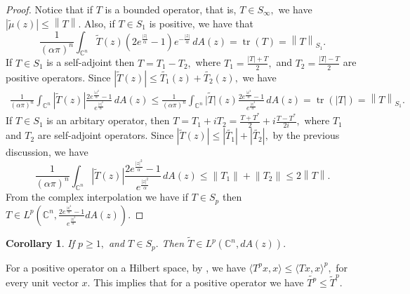 \documentclass[10pt,leqno]{amsart}
\newtheorem{proposition}[theorem]{Proposition}
\newtheorem{corollary}[theorem]{Corollary}
\theoremstyle{remark}
\numberwithin{equation}{section}
\DeclareMathOperator{\tr}{tr}
\begin{document}
\begin{proof}
	Notice that if $T$ is a bounded operator, that is, $T \in S_{\infty},$ we have $|\widetilde{\mu}(z)| \leq \left\lVert T \right\rVert. $ Also, if $T \in S_1$ is positive, we have that
	\[
		\frac{1}{\left( \alpha \pi \right) ^{n}}\int_{\mathbb{C}^{n}}^{}\widetilde{T}(z) \left( 2e^{\frac{|z|}{\alpha}}-1 \right) e^{-\frac{|z|}{\alpha}}\, dA(z) = \tr(T)=\left\lVert T \right\rVert _{S_{1}}.
	\]
	If $T \in S_1 $ is a self-adjoint then $T=T_1 -T_2,$ where $T_1 =\frac{|T|+T}{2},$ and $T_2 = \frac{|T|-T}{2}$ are positive operators. Since $|\widetilde{T}(z)|\leq \widetilde{T_1 }(z)+\widetilde{T_2 }(z),$ we have
	\begin{align*}
		\frac{1}{\left( \alpha \pi \right) ^{n}} \int_{\mathbb{C}^{n}}^{}\left| \widetilde{T}(z) \right| \frac{2e^{\frac{|z|^2}{\alpha}}-1 }{ e^{\frac{|z|^2}{\alpha}}} \, dA(z) \leq \frac{1}{\left( \alpha \pi \right) ^{n}}\int_{\mathbb{C}^{n}}^{} \widetilde{|T|}(z)\frac{ 2e^{\frac{|z|^2}{\alpha}}-1 }{ e^{\frac{|z|^2}{\alpha}}} \, dA(z) = \tr(|T|)=\left\lVert T \right\rVert _{S_1}.
	\end{align*}
	If $T \in S_1$ is an arbitary operator, then $T=T_1 + i T_2 = \frac{T+T^*}{2}+i \frac{T-T^*}{2i},$ where $T_1$ and $T_2 $ are self-adjoint operators. Since
	\(\left| \widetilde{T}(z) \right| \leq \left| \widetilde{T_1 } \right| + \left| \widetilde{T_2 } \right|,\) by the previous discussion, we have
	\[
		\frac{1}{\left( \alpha \pi \right) ^{n}} \int_{\mathbb{C}^{n}}^{}\left| \widetilde{T}(z) \right| \frac{2e^{\frac{|z|^2}{\alpha}}-1 }{ e^{\frac{|z|^2}{\alpha}}} \, dA(z) \leq\left\lVert T_1  \right\rVert +\left\lVert  T_2  \right\rVert \leq  2  \left\lVert  T \right\rVert.
	\]
	From the complex interpolation we have if $T \in S_p$ then $T \in L^p(\mathbb{C}^{n},\frac{2e^{\frac{|z|^2}{\alpha}}-1}{e^{\frac{|z|^2}{\alpha}}}dA(z)).$
\end{proof}
\begin{corollary}
	If $p\geq 1,$ and $T \in S_p.$ Then $\widetilde{T} \in L^p(\mathbb{C}^{n},dA(z)).$
\end{corollary}
For a positive operator on a Hilbert space, by \cite[Prop. 1.31]{zhuOperatorTheoryFunction2007}, we have $\langle T^{p}x,x \rangle\leq \langle Tx,x \rangle^{p},$ for every unit vector $x.$ This implies that for a positive operator we have $ \widetilde{T^p}\leq \widetilde{T}^p.$
\end{document}
